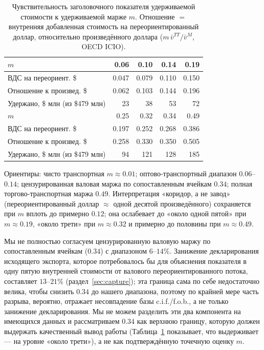 \documentclass[12pt]{article}
\begin{document}
\begin{table}[htbp]
\centering
\caption{Чувствительность заголовочного показателя удерживаемой стоимости к удерживаемой
марже $m$. Отношение $=$ внутренняя добавленная стоимость на переориентированный доллар,
относительно произведённого доллара ($m\,\bar v^{TT}/\bar v^{M}$, OECD ICIO).}
\label{tab:appd}
\footnotesize
\begin{tabular}{@{}lrrrr@{}}
\toprule
$m$ & 0.06 & 0.10 & 0.14 & 0.19 \\
\midrule
ВДС на переориент. \$ & 0.047 & 0.079 & 0.110 & 0.150 \\
Отношение к произвед. \$ & 0.062 & 0.103 & 0.144 & 0.196 \\
Удержано, \$ млн (из \$479 млн) & 23 & 38 & 53 & 72 \\
\midrule
$m$ & 0.25 & 0.32 & 0.34 & 0.49 \\
\midrule
ВДС на переориент. \$ & 0.197 & 0.252 & 0.268 & 0.386 \\
Отношение к произвед. \$ & 0.258 & 0.330 & 0.350 & 0.505 \\
Удержано, \$ млн (из \$479 млн) & 94 & 121 & 128 & 185 \\
\bottomrule
\end{tabular}

\vspace{2pt}
\footnotesize Ориентиры: чисто транспортная $m\approx 0.01$; оптово-транспортный диапазон
$0.06$--$0.14$; цензурированная валовая маржа по сопоставленным ячейкам $0.34$; полная
торгово-транспортная маржа $0.49$. Интерпретация «коридор, а не завод» (переориентированный
доллар $\approx$ одной десятой произведённого) сохраняется при $m$ вплоть до примерно
$0.12$; она ослабевает до «около одной пятой» при $m\approx 0.19$, «около трети» при
$m\approx 0.32$ и примерно до половины при $m\approx 0.49$.
\end{table}

Мы не полностью согласуем цензурированную валовую маржу по сопоставленным ячейкам ($0.34$)
с диапазоном $6$--$14\%$. Занижение декларирования исходящего экспорта, которое
потребовалось бы для объяснения показателя в одну пятую внутренней стоимости от валового
переориентированного потока, составляет $13$--$21\%$ (раздел~\ref{sec:capture}); эта
граница сама по себе недостаточно велика, чтобы снизить $0.34$ до нашего диапазона, поэтому
по крайней мере часть разрыва, вероятно, отражает несовпадение базы c.i.f./f.o.b., а не
только занижение декларирования. Мы не можем разделить эти два компонента на имеющихся
данных и рассматриваем $0.34$ как верхнюю границу, которую должен выдержать качественный
вывод работы (Таблица~\ref{tab:appd} показывает, что выдерживает — на уровне «около трети»),
а не как подтверждённую точечную оценку $m$.
\end{document}
